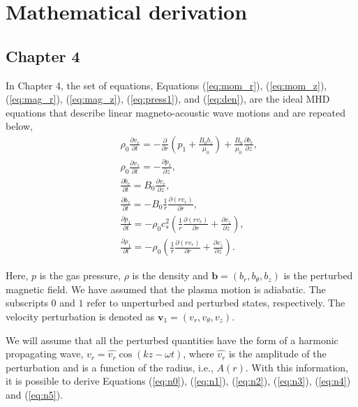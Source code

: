 \chapter{Mathematical derivation} 

\section*{Chapter 4}

In Chapter 4, the set of equations, Equations (\ref{eq:mom_r}), (\ref{eq:mom_z}), (\ref{eq:mag_r}), (\ref{eq:mag_z}), (\ref{eq:press1}), and (\ref{eq:den}), are the ideal MHD equations that describe linear magneto-acoustic wave motions and are repeated below,
\begin{align}
    &&\rho_0 \frac{\partial v_r}{\partial t}=-\frac{\partial}{\partial r}
    \left(p_1+\frac{B_0b_z}{\mu_0}\right)+\frac{B_0}{\mu_0}\frac{\partial b_r}{\partial z},
    \label{eq:apen_mom_r}\\
    &&\rho_0\frac{\partial v_z}{\partial t}=-\frac{\partial p_1}{\partial z},
    \label{eq:apen_mom_z}\\
    &&\frac{\partial b_r}{\partial t}=B_0\frac{\partial v_r}{\partial z},
    \label{eq:apen_mag_r}\\
    &&\frac{\partial b_z}{\partial t}=-B_0\frac{1}{r}\frac{\partial (rv_r)}{\partial r},\\
    &&\frac{\partial p_1}{\partial t}=-\rho_0
    c_s^2\left(\frac{1}{r}\frac{\partial(rv_r)}{\partial r}+\frac{\partial v_z}{\partial z}\right),
    \label{eq:apen_press1}\\
    &&\frac{\partial \rho_1}{\partial t}=-\rho_0\left(\frac{1}{r}\frac{\partial (rv_r)}{\partial r}+\frac{\partial v_z}{\partial z}\right).
    \label{eq:apen_den}
\end{align}

Here, $p$ is the gas pressure, $\rho$ is the density and $\textbf{b} = (b_r,b_{\theta},b_z)$ is the perturbed magnetic field.
We have assumed that the plasma motion is adiabatic.
The subscripts $0$ and $1$ refer to unperturbed and perturbed states, respectively.
The velocity perturbation is denoted as $\textbf{v}_1= (v_r, v_{\theta}, v_z)$.

We will assume that all the perturbed quantities have the form of a harmonic propagating wave, $v_r=\hat{v_r}\cos(kz-\omega t)$, where $\hat{v_r}$ is the amplitude of the perturbation and is a function of the radius, i.e., $A(r)$.
With this information, it is possible to derive Equations (\ref{eq:n0}), (\ref{eq:n1}), (\ref{eq:n2}), (\ref{eq:n3}), (\ref{eq:n4}) and (\ref{eq:n5}).

